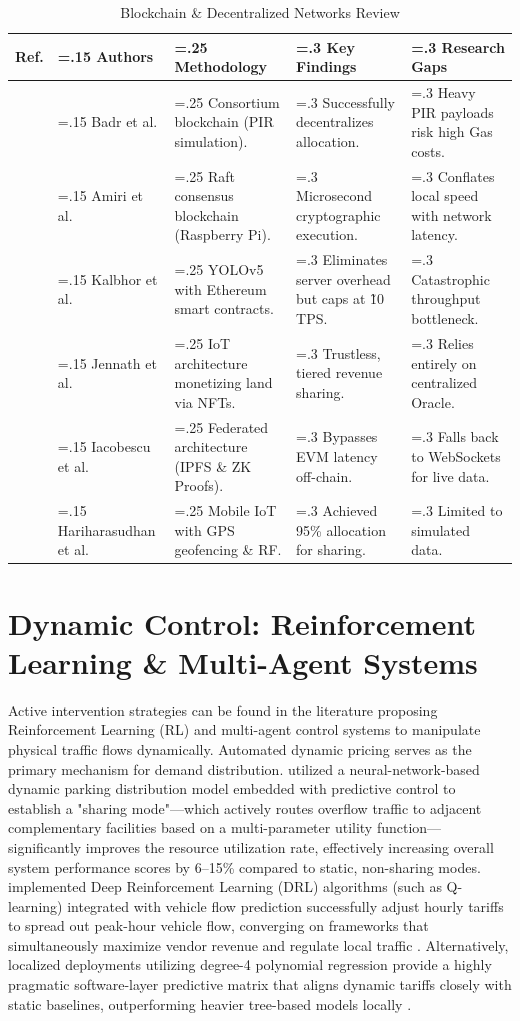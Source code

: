 \documentclass[conference]{IEEEtran}
\begin{document}
\begin{table}[!htbp]
\caption{Blockchain \& Decentralized Networks Review}
\label{tab:blockchain}
\centering
\begin{tabularx}{\textwidth}{@{} l >{\hsize=.15\hsize}X >{\hsize=.25\hsize}X >{\hsize=.3\hsize}X >{\hsize=.3\hsize}X @{}}
\toprule
\textbf{Ref.} & \textbf{Authors} & \textbf{Methodology} & \textbf{Key Findings} & \textbf{Research Gaps} \\
\midrule
\cite{b34} & Badr et al. & Consortium blockchain (PIR simulation). & Successfully decentralizes allocation. & Heavy PIR payloads risk high Gas costs. \\
\cite{b31} & Amiri et al. & Raft consensus blockchain (Raspberry Pi). & Microsecond cryptographic execution. & Conflates local speed with network latency. \\
\cite{b27} & Kalbhor et al. & YOLOv5 with Ethereum smart contracts. & Eliminates server overhead but caps at \~10 TPS. & Catastrophic throughput bottleneck. \\
\cite{b26} & Jennath et al. & IoT architecture monetizing land via NFTs. & Trustless, tiered revenue sharing. & Relies entirely on centralized Oracle. \\
\cite{b39} & Iacobescu et al. & Federated architecture (IPFS \& ZK Proofs). & Bypasses EVM latency off-chain. & Falls back to WebSockets for live data. \\
\cite{b40} & Hariharasudhan et al. & Mobile IoT with GPS geofencing \& RF. & Achieved 95\% allocation for sharing. & Limited to simulated data. \\
\bottomrule
\end{tabularx}
\end{table}

\section{Dynamic Control: Reinforcement Learning \& Multi-Agent Systems}
Active intervention strategies can be found in the literature proposing Reinforcement Learning (RL) and multi-agent control systems to manipulate physical traffic flows dynamically. Automated dynamic pricing serves as the primary mechanism for demand distribution. \cite{b22} utilized a neural-network-based dynamic parking distribution model embedded with predictive control to establish a "sharing mode"—which actively routes overflow traffic to adjacent complementary facilities based on a multi-parameter utility function—significantly improves the resource utilization rate, effectively increasing overall system performance scores by 6–15\% compared to static, non-sharing modes.\cite{b11} implemented Deep Reinforcement Learning (DRL) algorithms (such as Q-learning) integrated with vehicle flow prediction successfully adjust hourly tariffs to spread out peak-hour vehicle flow, converging on frameworks that simultaneously maximize vendor revenue and regulate local traffic . Alternatively, localized deployments utilizing degree-4 polynomial regression provide a highly pragmatic software-layer predictive matrix that aligns dynamic tariffs closely with static baselines, outperforming heavier tree-based models locally \cite{b33}.
\end{document}
